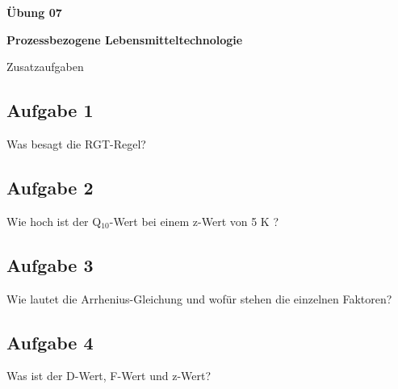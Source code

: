 \documentclass[a4paper,10pt]{article}
\newif\ifshowme
\begin{document}


\begin{center}
\LARGE
\color{uniblau}
\textbf{Übung 07} \par \vspace*{2mm}
\large \color{miugray!50!black} \textbf{Prozessbezogene Lebensmitteltechnologie}\par 
\normalsize Zusatzaufgaben
\end{center}
\par 


\color{miudiutex}

\begin{multicols}{2}
\subsection*{Aufgabe 1}
Was besagt die RGT-Regel?
\ifshowme
\antwort{Die RGT-Regel (Reaktionsgeschwindigkeit-Temperatur-Regel) ist eine Faustregel der chemischen Kinetik und erlaubt die Abschätzung vieler Phänomene der Chemie, Biochemie und Ökologie. Sie besagt, dass chemische Reaktionen bei einer um 10 K erhöhten Temperatur ungefähr doppelt bis viermal so schnell ablaufen.}
\else
\fi




\subsection*{Aufgabe 2}

Wie hoch ist der Q$_{10}$-Wert bei einem z-Wert von 5 K ?
\ifshowme
\antwort{
\begin{align*}
Q_{10} = \frac{k_{T+10}}{k_T} = 100
\end{align*}
}
\else
\fi


\subsection*{Aufgabe 3}
Wie lautet die Arrhenius-Gleichung und wofür stehen die einzelnen Faktoren?
\ifshowme
\antwort{
\begin{align*}
k = A \cdot 10^{- \frac{E_A}{R \cdot T}}
\end{align*}
}
\else
\fi

\subsection*{Aufgabe 4}
Was ist der D-Wert, F-Wert und z-Wert?



\end{multicols}
\end{document}
